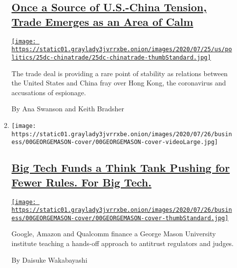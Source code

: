 \begin{enumerate}
\begin{enumerate}
    \hypertarget{once-a-source-of-us-china-tension-trade-emerges-as-an-area-of-calm}{%
    \subsection{\texorpdfstring{\href{/2020/07/25/business/economy/us-china-trade-diplomacy.html}{Once
    a Source of U.S.-China Tension, Trade Emerges as an Area of
    Calm}}{Once a Source of U.S.-China Tension, Trade Emerges as an Area of Calm}}\label{once-a-source-of-us-china-tension-trade-emerges-as-an-area-of-calm}}

    \href{/2020/07/25/business/economy/us-china-trade-diplomacy.html}{\texttt{[image: https://static01.graylady3jvrrxbe.onion/images/2020/07/25/us/politics/25dc-chinatrade/25dc-chinatrade-thumbStandard.jpg]}}

    The trade deal is providing a rare point of stability as relations
    between the United States and China fray over Hong Kong, the
    coronavirus and accusations of espionage.

    By Ana Swanson and Keith Bradsher
  \item
    \texttt{[image: https://static01.graylady3jvrrxbe.onion/images/2020/07/26/business/00GEORGEMASON-cover/00GEORGEMASON-cover-videoLarge.jpg]}

    \hypertarget{big-tech-funds-a-think-tank-pushing-for-fewer-rules-for-big-tech}{%
    \subsection{\texorpdfstring{\href{/2020/07/24/technology/global-antitrust-institute-google-amazon-qualcomm.html}{Big
    Tech Funds a Think Tank Pushing for Fewer Rules. For Big
    Tech.}}{Big Tech Funds a Think Tank Pushing for Fewer Rules. For Big Tech.}}\label{big-tech-funds-a-think-tank-pushing-for-fewer-rules-for-big-tech}}

    \href{/2020/07/24/technology/global-antitrust-institute-google-amazon-qualcomm.html}{\texttt{[image: https://static01.graylady3jvrrxbe.onion/images/2020/07/26/business/00GEORGEMASON-cover/00GEORGEMASON-cover-thumbStandard.jpg]}}

    Google, Amazon and Qualcomm finance a George Mason University
    institute teaching a hands-off approach to antitrust regulators and
    judges.

    By Daisuke Wakabayashi
  \end{enumerate}
\end{enumerate}

